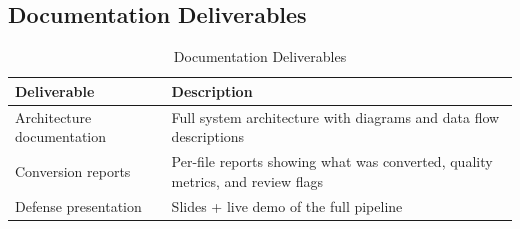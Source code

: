 \documentclass[11pt,a4paper]{article}
\begin{document}
\subsection{Documentation Deliverables}

\begin{table}[H]
\centering
\caption{Documentation Deliverables}
\renewcommand{\arraystretch}{1.25}
\begin{tabularx}{\textwidth}{@{} L{4.5cm} X @{}}
\toprule
\textbf{Deliverable} & \textbf{Description} \\
\midrule
Architecture documentation & Full system architecture with diagrams and data flow descriptions \\
Conversion reports & Per-file reports showing what was converted, quality metrics, and review flags \\
Defense presentation & Slides + live demo of the full pipeline \\
\bottomrule
\end{tabularx}
\end{table}
\end{document}
